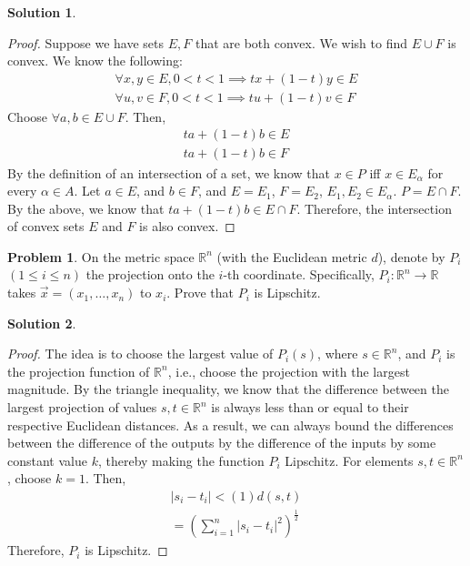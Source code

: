 \documentclass[12pt]{article}
\theoremstyle{definition} %
\newtheorem{solution}{Solution}
\newtheorem{problem}{Problem}
\theoremstyle{plain} %
\begin{document}
\begin{solution}
    \begin{proof}
        Suppose we have sets $E,F$ that are both convex. We wish to find $E\cup F$ is convex. We know the following:
        \begin{align}
            \forall x, y \in E, 0<t<1 \implies tx+(1-t)y\in E\\[10pt] 
            \forall u, v \in F, 0<t<1 \implies tu+(1-t)v \in F
        \end{align}
        Choose $\forall a,b \in E\cup F$. Then,
        \begin{align}
            ta+(1-t)b\in E\\[10pt] 
            ta+(1-t)b \in F
        \end{align} 
        By the definition of an intersection of a set, we know that $x\in P$ iff $x\in E_{\alpha}$ for every $\alpha \in A$. Let $a \in E$, and $b \in F$, and $E = E_1$, $F = E_2$, $E_1, E_2 \in E_{\alpha}$. $P=E\cap F$. By the above, we know that $ta+(1-t)b\in E\cap F$. Therefore, the intersection of convex sets $E$ and $F$ is also convex.        
    \end{proof}
\end{solution}
\begin{problem}
On the metric space $\mathbb{R}^n$ (with the Euclidean metric $d$), denote by $P_i$ $(1 \leq i \leq n)$ the projection onto the $i$-th coordinate. Specifically, $P_i : \mathbb{R}^n \to \mathbb{R}$ takes $\vec{x} = (x_1, \dots, x_n)$ to $x_i$. Prove that $P_i$ is Lipschitz.
\end{problem}
\begin{solution}
    \begin{proof}
        The idea is to choose the largest value of $P_i(s)$, where $s\in \mathbb{R}^{n}$, and $P_i$ is the projection function of $\mathbb{R}^{n}$, i.e., choose the projection with the largest magnitude. By the triangle inequality, we know that the difference between the largest projection of values $s, t \in \mathbb{R}^{n}$ is always less than or equal to their respective Euclidean distances. As a result, we can always bound the differences between the difference of the outputs by the difference of the inputs by some constant value $k$, thereby making the function $P_i$ Lipschitz. For elements $ s, t \in \mathbb{R}^{n} $, choose $k=1$. Then,
        \begin{align}
            \left\vert s_i - t_i \right\vert < (1)d(s,t) \\[10pt] 
            =\left(  \sum_{i=1}^{n} \left\vert s_i - t_i \right\vert^{2}  \right)^{\frac{1}{2}}
        \end{align}
        Therefore, $P_i$ is Lipschitz. 
         \end{proof}
\end{solution}
\end{document}
